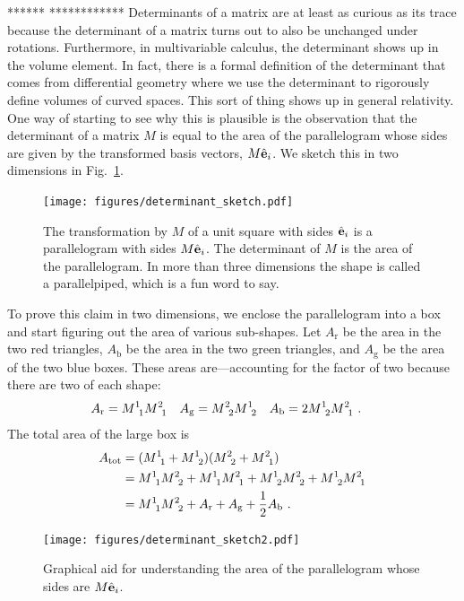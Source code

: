 \documentclass[12pt, oneside]{report}    %
\begin{document}
******
************
Determinants of a matrix are at least as curious as its trace because the determinant of a matrix turns out to also be unchanged under rotations. Furthermore, in multivariable calculus, the determinant shows up in the volume element. In fact, there is a formal definition of the determinant that comes from differential geometry where we use the determinant to rigorously define volumes of curved spaces. This sort of thing shows up in general relativity.
%
One way of starting to see why this is plausible is the observation that the determinant of a matrix $M$ is equal to the area of the parallelogram whose sides are given by the transformed basis vectors, $M\hat{\mathbf{e}}_i$. We sketch this in two dimensions in Fig.~\ref{fig:determinant:map:area}. 
% 
\begin{figure}[tb]
    \centering
    \texttt{[image: figures/determinant\_sketch.pdf]}
    \caption{The transformation by $M$ of a unit square with sides $\hat{\mathbf{e}}_i$ is a parallelogram with sides $M\hat{\mathbf{e}}_i$. The determinant of $M$ is the area of the parallelogram. In more than three dimensions the shape is called a parallelpiped, which is a fun word to say.}
    \label{fig:determinant:map:area}
\end{figure}
% 
To prove this claim in two dimensions, we enclose the parallelogram into a box and start figuring out the area of various sub-shapes. Let $A_\text{r}$ be the area in the two red triangles, $A_\text{b}$ be the area in the two green triangles, and $A_\text{g}$ be the area of the two blue boxes. These areas are---accounting for the factor of two because there are two of each shape:
\begin{align}
    A_\text{r} &= M\aij 11 M \aij 21
    &
    A_\text{g} &= M\aij 22 M \aij 12
    &
    A_\text{b} &= 2 M\aij 12 M \aij 21 \ .
\end{align}
The total area of the large box is
\begin{align}
    A_\text{tot} &= (M\aij 11 + M\aij 12)(M\aij 22 + M\aij 21) 
    \\&= M\aij 11 M\aij 22 + 
    M\aij 11 M\aij 21 + 
    M\aij 12 M\aij 22 + 
    M\aij 12 M\aij 21 
    \\ &= 
    M\aij 11 M\aij 22 + 
    A_\text{r} + 
    A_\text{g}  + 
    \frac 12 A_\text{b} 
    \ . 
\end{align}
% 
\begin{figure}[tb]
    \centering
    \texttt{[image: figures/determinant\_sketch2.pdf]}
    \caption{Graphical aid for understanding the area of the parallelogram whose sides are $M\hat{\mathbf{e}}_i$.}
    \label{fig:determinant:map:area:proof}
\end{figure}
\end{document}
